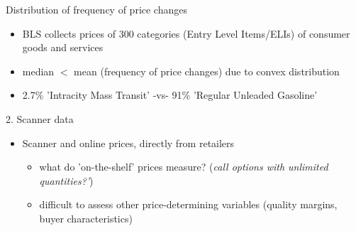 \documentclass{beamer}
\begin{document}
\begin{frame}{Distribution of frequency of price changes}


\begin{itemize}
\small
\item BLS collects prices of 300 categories (Entry Level Items/ELIs) of consumer goods and services
\item median $<$ mean (frequency of price changes) due to convex distribution
\end{itemize}

\begin{center}

\begin{figure}[h!]
\end{figure}

\end{center}

\begin{itemize}
\scriptsize
\item 2.7\% 'Intracity Mass Transit' -vs- 91\% 'Regular Unleaded Gasoline'
\end{itemize}

\end{frame}
\begin{frame}{2. Scanner data}


\begin{itemize}
\small
\item Scanner and online prices, directly from retailers
\begin{itemize}
\small
\item what do 'on-the-shelf' prices measure? (\emph{call options with unlimited quantities?'})
\item difficult to assess other price-determining variables (quality margins, buyer characteristics)
\end{itemize}
\end{itemize}

\end{frame}
\end{document}
